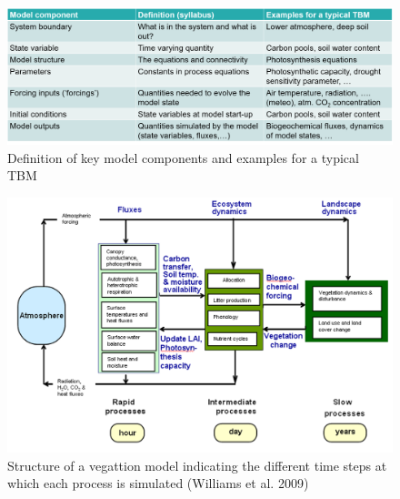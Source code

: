 \documentclass[
  oneside]{book}
\begin{document}
\begin{figure}

{\centering \includegraphics[width=0.8\linewidth]{figures/chap1/table_components} 

}

\caption{Definition of key model components and examples for a typical TBM}\label{fig:f8}
\end{figure}

\begin{figure}

{\centering \includegraphics[width=0.8\linewidth]{figures/chap1/time_steps} 

}

\caption{Structure of a vegattion model indicating the different time steps at which each process is simulated (Williams et al. 2009)}\label{fig:f9}
\end{figure}
\end{document}
